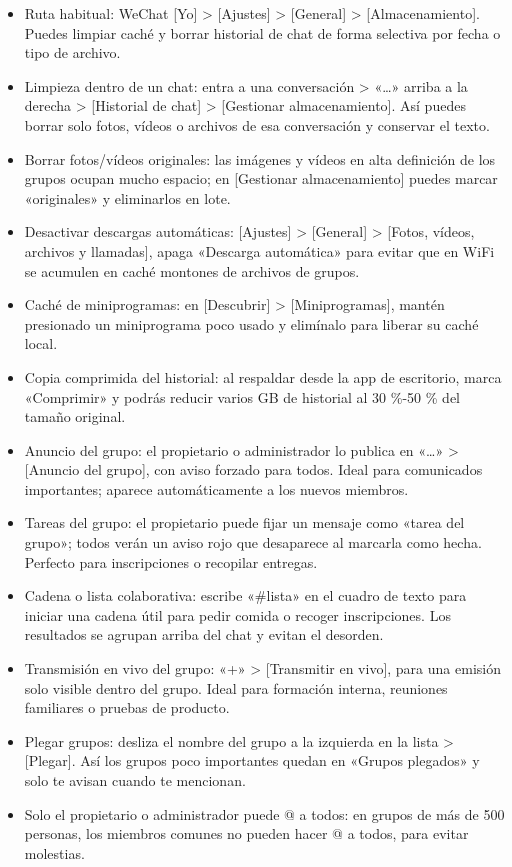
\begin{itemize}
  \item Ruta habitual: WeChat [Yo] > [Ajustes] > [General] > [Almacenamiento]. Puedes limpiar caché y borrar historial de chat de forma selectiva por fecha o tipo de archivo.
  \item Limpieza dentro de un chat: entra a una conversación > «…» arriba a la derecha > [Historial de chat] > [Gestionar almacenamiento]. Así puedes borrar solo fotos, vídeos o archivos de esa conversación y conservar el texto.
  \item Borrar fotos/vídeos originales: las imágenes y vídeos en alta definición de los grupos ocupan mucho espacio; en [Gestionar almacenamiento] puedes marcar «originales» y eliminarlos en lote.
  \item Desactivar descargas automáticas: [Ajustes] > [General] > [Fotos, vídeos, archivos y llamadas], apaga «Descarga automática» para evitar que en WiFi se acumulen en caché montones de archivos de grupos.
  \item Caché de miniprogramas: en [Descubrir] > [Miniprogramas], mantén presionado un miniprograma poco usado y elimínalo para liberar su caché local.
  \item Copia comprimida del historial: al respaldar desde la app de escritorio, marca «Comprimir» y podrás reducir varios GB de historial al 30 \%-50 \% del tamaño original.
\end{itemize}


\begin{itemize}
  \item Anuncio del grupo: el propietario o administrador lo publica en «…» > [Anuncio del grupo], con aviso forzado para todos. Ideal para comunicados importantes; aparece automáticamente a los nuevos miembros.
  \item Tareas del grupo: el propietario puede fijar un mensaje como «tarea del grupo»; todos verán un aviso rojo que desaparece al marcarla como hecha. Perfecto para inscripciones o recopilar entregas.
  \item Cadena o lista colaborativa: escribe «\#lista» en el cuadro de texto para iniciar una cadena útil para pedir comida o recoger inscripciones. Los resultados se agrupan arriba del chat y evitan el desorden.
  \item Transmisión en vivo del grupo: «+» > [Transmitir en vivo], para una emisión solo visible dentro del grupo. Ideal para formación interna, reuniones familiares o pruebas de producto.
  \item Plegar grupos: desliza el nombre del grupo a la izquierda en la lista > [Plegar]. Así los grupos poco importantes quedan en «Grupos plegados» y solo te avisan cuando te mencionan.
  \item Solo el propietario o administrador puede @ a todos: en grupos de más de 500 personas, los miembros comunes no pueden hacer @ a todos, para evitar molestias.
\end{itemize}

